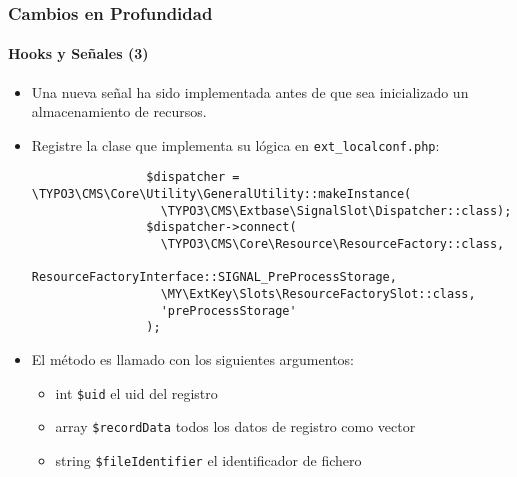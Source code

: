 \begin{frame}[fragile]
	\frametitle{Cambios en Profundidad}
	\framesubtitle{Hooks y Señales (3)}

	\lstset{basicstyle=\tiny\ttfamily}

	\begin{itemize}

		\item Una nueva señal ha sido implementada antes de que sea inicializado un almacenamiento de recursos.

		\item Registre la clase que implementa su lógica en \texttt{ext\_localconf.php}:

			\begin{lstlisting}
				$dispatcher = \TYPO3\CMS\Core\Utility\GeneralUtility::makeInstance(
				  \TYPO3\CMS\Extbase\SignalSlot\Dispatcher::class);
				$dispatcher->connect(
				  \TYPO3\CMS\Core\Resource\ResourceFactory::class,
				  ResourceFactoryInterface::SIGNAL_PreProcessStorage,
				  \MY\ExtKey\Slots\ResourceFactorySlot::class,
				  'preProcessStorage'
				);
			\end{lstlisting}

		\item El método es llamado con los siguientes argumentos:

			\begin{itemize}
				\item int \texttt{\$uid} el uid del registro
				\item array \texttt{\$recordData} todos los datos de registro como vector
				\item string \texttt{\$fileIdentifier} el identificador de fichero
			\end{itemize}

	\end{itemize}

\end{frame}

